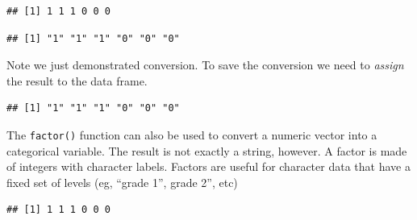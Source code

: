 \documentclass[
]{book}
\newenvironment{Shaded}{\begin{snugshade}}{\end{snugshade}}
\newcommand{\CommentTok}[1]{\textcolor[rgb]{0.56,0.35,0.01}{\textit{#1}}}
\newcommand{\FunctionTok}[1]{\textcolor[rgb]{0.00,0.00,0.00}{#1}}
\newcommand{\NormalTok}[1]{#1}
\newcommand{\OtherTok}[1]{\textcolor[rgb]{0.56,0.35,0.01}{#1}}
\newcommand{\SpecialCharTok}[1]{\textcolor[rgb]{0.00,0.00,0.00}{#1}}
\begin{document}
\begin{verbatim}
## [1] 1 1 1 0 0 0
\end{verbatim}

\begin{Shaded}
\end{Shaded}

\begin{verbatim}
## [1] "1" "1" "1" "0" "0" "0"
\end{verbatim}

Note we just demonstrated conversion. To save the conversion we need to \emph{assign} the result to the data frame.

\begin{Shaded}
\end{Shaded}

\begin{verbatim}
## [1] "1" "1" "1" "0" "0" "0"
\end{verbatim}

The \texttt{factor()} function can also be used to convert a numeric vector into a categorical variable. The result is not exactly a string, however. A factor is made of integers with character labels. Factors are useful for character data that have a fixed set of levels (eg, ``grade 1'', grade 2'', etc)

\begin{Shaded}
\end{Shaded}

\begin{verbatim}
## [1] 1 1 1 0 0 0
\end{verbatim}

\begin{Shaded}
\end{Shaded}
\end{document}
